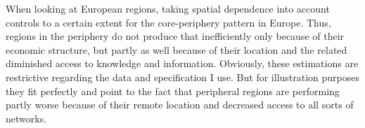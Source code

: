 \documentclass[11pt,parskip,abstracton,notitlepage]{scrartcl}
\begin{document}
When looking at European regions, taking spatial dependence into account
controls to a certain extent for the core-periphery pattern in Europe. Thus,
regions in the periphery do not produce that inefficiently only because of their
economic structure, but partly as well because of their location and the related
diminished access to knowledge and information. Obviously, these estimations are
restrictive regarding the data and specification I use. But for illustration
purposes they fit perfectly and point to the fact that peripheral regions are
performing partly worse because of their remote location and decreased access to
all sorts of networks.
%
\begin{spacing}{1.2}
	\printbibliography
\end{spacing}
\end{document}
